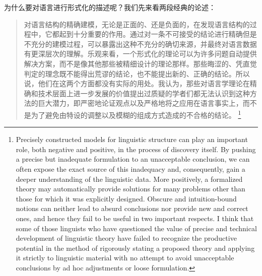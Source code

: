 为什么要对语言进行形式化的描述呢？我们先来看两段经典的论述：
\begin{quotation}
\label{quote-Chomsky-Formalisierung}%
对语言结构的精确建模，无论是正面的、还是负面的，在发现语言结构的过程中，它都起到十分重要的作用。通过对一条不可接受的结论进行精确但是不充分的建模过程，可以暴露出这种不充分的确切来源，并最终对语言数据有更深层次的理解。乐观来看，一个形式化的理论可以为许多问题自动提供解决方案，而不是像其他那些被精细设计的理论那样。那些晦涩的、凭直觉判定的理念既不能得出荒谬的结论，也不能提出新的、正确的结论。所以说，他们在这两个方面都没有实际的用处。我认为，那些对语言学理论在精确和技术层面上进一步发展的价值提出过质疑的学者们都无法认识到这种方法的巨大潜力，即严密地论证观点以及严格地将之应用在语言事实上，而不是为了避免由特设的调整以及模糊的组成方式造成的不合格的结论。
\citep[]{Chomsky57a}\footnote{%
Precisely constructed models for linguistic structure can play an
important role, both negative and positive, in the process of discovery 
itself. By pushing a precise but inadequate formulation to
an unacceptable conclusion, we can often expose the exact source
of this inadequacy and, consequently, gain a deeper understanding
of the linguistic data. More positively, a formalized theory may 
automatically provide solutions for many problems other than those
for which it was explicitly designed. Obscure and intuition-bound
notions can neither lead to absurd conclusions nor provide new and
correct ones, and hence they fail to be useful in two important respects. 
I think that some of those linguists who have questioned
the value of precise and technical development of linguistic theory
have failed to recognize the productive potential in the method
of rigorously stating a proposed theory and applying it strictly to
linguistic material with no attempt to avoid unacceptable conclusions 
by ad hoc adjustments or loose formulation.}
\end{quotation}

